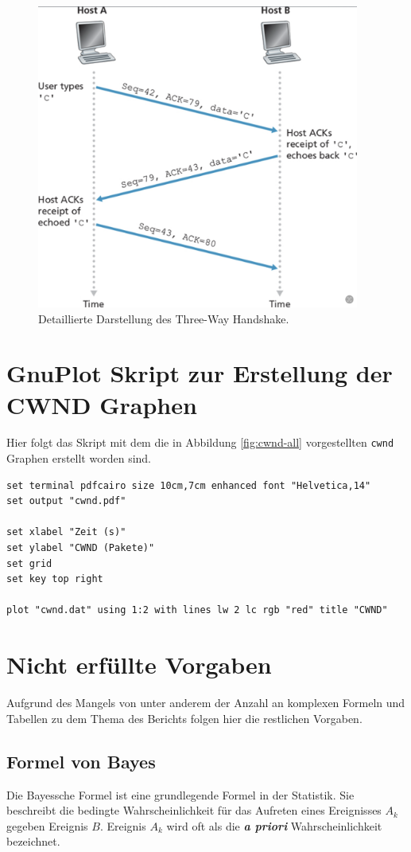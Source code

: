 \documentclass[paper=a4,fontsize=12pt,ngerman]{scrartcl}
\begin{document}
\begin{figure}[ht]
    \centering
    \includegraphics[height=10cm]{graphics/3way.png}
    \caption{Detaillierte Darstellung des Three-Way Handshake.}
    \label{fig:three-way handshake}
\end{figure}



\section{GnuPlot Skript zur Erstellung der CWND Graphen}
Hier folgt das Skript mit dem die in Abbildung \ref{fig:cwnd-all} vorgestellten \texttt{cwnd} Graphen erstellt worden sind.

\begin{verbatim}
set terminal pdfcairo size 10cm,7cm enhanced font "Helvetica,14"
set output "cwnd.pdf"

set xlabel "Zeit (s)"
set ylabel "CWND (Pakete)"
set grid
set key top right

plot "cwnd.dat" using 1:2 with lines lw 2 lc rgb "red" title "CWND"
\end{verbatim}


\section{Nicht erfüllte Vorgaben}
Aufgrund des Mangels von unter anderem der Anzahl an komplexen Formeln und Tabellen zu dem Thema des Berichts folgen hier die 
restlichen Vorgaben.

\subsection{Formel von Bayes}
Die Bayessche Formel ist eine grundlegende Formel in der Statistik. Sie beschreibt die bedingte Wahrscheinlichkeit für
das Aufreten eines Ereignisses $A_k$ gegeben Ereignis $B$. 
Ereignis $A_k$ wird oft als die \textbf{\textit{a priori}} Wahrscheinlichkeit bezeichnet.
\end{document}
